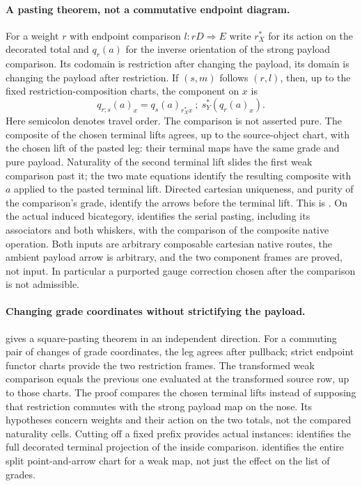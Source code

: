 \documentclass[10pt]{article}
\begin{document}
\paragraph{A pasting theorem, not a commutative endpoint diagram.}
For a weight $r$ with endpoint comparison $l:rD\Rightarrow E$ write $r^*_X$ for its action on the decorated total and $q_r(a)$ for the inverse orientation of the strong payload comparison. Its codomain is restriction after changing the payload, its domain is changing the payload after restriction. If $(s,m)$ follows $(r,l)$, then, up to the fixed restriction-composition charts, the component on $x$ is
\[
  q_{r;s}(a)_x=
  q_s(a)_{r_X^*x}\ ;\ s_Y^*(q_r(a)_x).
\]
Here semicolon denotes travel order. The comparison is not asserted pure. The composite of the chosen terminal lifts agrees, up to the source-object chart, with the chosen lift of the pasted leg: their terminal maps have the same grade and pure payload. Naturality of the second terminal lift slides the first weak comparison past it; the two mate equations identify the resulting composite with $a$ applied to the pasted terminal lift. Directed cartesian uniqueness, and purity of the comparison's grade, identify the arrows before the terminal lift. This is . On the actual induced bicategory,  identifies the serial pasting, including its associators and both whiskers, with the comparison of the composite native operation. Both inputs are arbitrary composable cartesian native routes, the ambient payload arrow is arbitrary, and the two component frames are proved, not input. In particular a purported gauge correction chosen after the comparison is not admissible.

\paragraph{Changing grade coordinates without strictifying the payload.}
 gives a square-pasting theorem in an independent direction. For a commuting pair of changes of grade coordinates, the leg agrees after pullback; strict endpoint functor charts provide the two restriction frames. The transformed weak comparison equals the previous one evaluated at the transformed source row, up to those charts. The proof compares the chosen terminal lifts instead of supposing that restriction commutes with the strong payload map on the nose. Its hypotheses concern weights and their action on the two totals, not the compared naturality cells. Cutting off a fixed prefix provides actual instances:  identifies the full decorated terminal projection of the inside comparison.  identifies the entire split point-and-arrow chart for a weak map, not just the effect on the list of grades.
\end{document}
